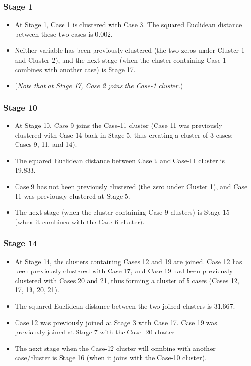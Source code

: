 \subsubsection*{Stage 1}
\begin{itemize}
	\item At Stage 1, Case 1 is clustered with Case 3. The squared Euclidean distance between these two cases is
	0.002. 
	\item Neither variable has been previously clustered (the two zeros under Cluster 1 and Cluster 2), and the
	next stage (when the cluster containing Case 1 combines with another case) is Stage 17. 
	\item (\textit{Note that at Stage
	17, Case 2 joins the Case-1 cluster.})
\end{itemize}


\subsubsection*{Stage 10}
\begin{itemize}
	\item At Stage 10, Case 9 joins the Case-11 cluster (Case 11 was previously clustered with Case 14 back in Stage
	5, thus creating a cluster of 3 cases: Cases 9, 11, and 14). 
	\item The squared Euclidean distance between Case 9
	and Case-11 cluster is 19.833. 
	\item Case 9 has not been previously clustered (the zero under Cluster 1), and
	Case 11 was previously clustered at Stage 5. 
	\item The next stage (when the cluster containing Case 9 clusters) is
	Stage 15 (when it combines with the Case-6 cluster).
\end{itemize}


\subsubsection*{Stage 14}
\begin{itemize}
	\item At Stage 14, the clusters containing Cases 12 and 19 are joined, Case 12 has been previously clustered with
	Case 17, and Case 19 had been previously clustered with Cases 20 and 21, thus forming a cluster of 5 cases
	(Cases 12, 17, 19, 20, 21). 
	\item The squared Euclidean distance between the two joined clusters is 31.667. 
	\item Case
	12 was previously joined at Stage 3 with Case 17. Case 19 was previously joined at Stage 7 with the Case-
	20 cluster. 
	\item The next stage when the Case-12 cluster will combine with another case/cluster is Stage 16
	(when it joins with the Case-10 cluster).
\end{itemize}


